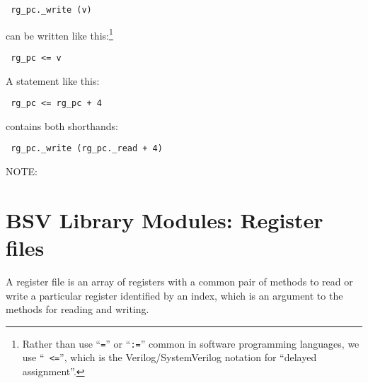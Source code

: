 \begin{tabbing}\small\tt
\hmmmm rg\_pc.\_write (v)
\end{tabbing}

can be written like this:\footnote{Rather than use ``{\tt =}'' or
``{\tt :=}'' common in software programming languages, we use ``{\tt
<=}'', which is the Verilog/SystemVerilog notation for ``delayed
assignment''.}

\begin{tabbing}\small\tt
\hmmmm rg\_pc <= v
\end{tabbing}

A statement like this:

\begin{tabbing}\small\tt
\hmmmm rg\_pc <= rg\_pc + 4
\end{tabbing}

contains both shorthands:

\begin{tabbing}\small\tt
\hmmmm rg\_pc.\_write (rg\_pc.\_read + 4)
\end{tabbing}

\vspace{2ex}

NOTE:


\section{BSV Library Modules: Register files}

\label{Sec_Register_files}


A register file is an array of registers with a common pair of methods
to read or write a particular register identified by an index, which
is an argument to the methods for reading and writing.

